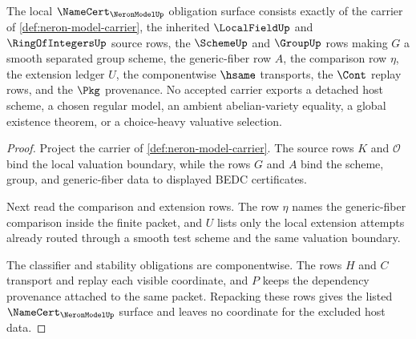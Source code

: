 \begin{theorem}
\label{thm:neron-model-namecert-obligations}
The local $\NameCert_{\NeronModelUp}$ obligation surface consists exactly of the carrier of \autoref{def:neron-model-carrier}, the inherited $\LocalFieldUp$ and $\RingOfIntegersUp$ source rows, the $\SchemeUp$ and $\GroupUp$ rows making $G$ a smooth separated group scheme, the generic-fiber row $A$, the comparison row $\eta$, the extension ledger $U$, the componentwise $\hsame$ transports, the $\Cont$ replay rows, and the $\Pkg$ provenance. No accepted carrier exports a detached host scheme, a chosen regular model, an ambient abelian-variety equality, a global existence theorem, or a choice-heavy valuative selection.
\end{theorem}
\begin{proof}
Project the carrier of \autoref{def:neron-model-carrier}. The source rows $K$ and $\mathcal O$ bind the local valuation boundary, while the rows $G$ and $A$ bind the scheme, group, and generic-fiber data to displayed BEDC certificates.

Next read the comparison and extension rows. The row $\eta$ names the generic-fiber comparison inside the finite packet, and $U$ lists only the local extension attempts already routed through a smooth test scheme and the same valuation boundary.

The classifier and stability obligations are componentwise. The rows $H$ and $C$ transport and replay each visible coordinate, and $P$ keeps the dependency provenance attached to the same packet. Repacking these rows gives the listed $\NameCert_{\NeronModelUp}$ surface and leaves no coordinate for the excluded host data.
\end{proof}

